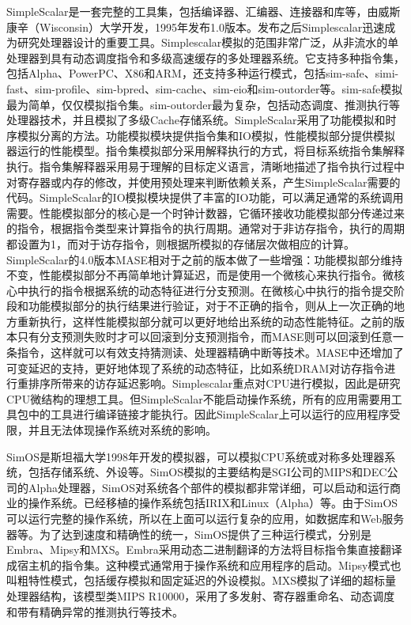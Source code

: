 \documentclass[]{ctexbook}
\begin{document}
SimpleScalar是一套完整的工具集，包括编译器、汇编器、连接器和库等，由威斯康辛（Wisconsin）大学开发，1995年发布1.0版本。发布之后Simplescalar迅速成为研究处理器设计的重要工具。Simplescalar模拟的范围非常广泛，从非流水的单处理器到具有动态调度指令和多级高速缓存的多处理器系统。它支持多种指令集，包括Alpha、PowerPC、X86和ARM，还支持多种运行模式，包括sim-safe、simi-fast、sim-profile、sim-bpred、sim-cache、sim-eio和sim-outorder等。sim-safe模拟最为简单，仅仅模拟指令集。sim-outorder最为复杂，包括动态调度、推测执行等处理器技术，并且模拟了多级Cache存储系统。SimpleScalar采用了功能模拟和时序模拟分离的方法。功能模拟模块提供指令集和IO模拟，性能模拟部分提供模拟器运行的性能模型。指令集模拟部分采用解释执行的方式，将目标系统指令集解释执行。指令集解释器采用易于理解的目标定义语言，清晰地描述了指令执行过程中对寄存器或内存的修改，并使用预处理来判断依赖关系，产生SimpleScalar需要的代码。SimpleScalar的IO模拟模块提供了丰富的IO功能，可以满足通常的系统调用需要。性能模拟部分的核心是一个时钟计数器，它循环接收功能模拟部分传递过来的指令，根据指令类型来计算指令的执行周期。通常对于非访存指令，执行的周期都设置为1，而对于访存指令，则根据所模拟的存储层次做相应的计算。SimpleScalar的4.0版本MASE相对于之前的版本做了一些增强：功能模拟部分维持不变，性能模拟部分不再简单地计算延迟，而是使用一个微核心来执行指令。微核心中执行的指令根据系统的动态特征进行分支预测。在微核心中执行的指令提交阶段和功能模拟部分的执行结果进行验证，对于不正确的指令，则从上一次正确的地方重新执行，这样性能模拟部分就可以更好地给出系统的动态性能特征。之前的版本只有分支预测失败时才可以回滚到分支预测指令，而MASE则可以回滚到任意一条指令，这样就可以有效支持猜测读、处理器精确中断等技术。MASE中还增加了可变延迟的支持，更好地体现了系统的动态特征，比如系统DRAM对访存指令进行重排序所带来的访存延迟影响。Simplescalar重点对CPU进行模拟，因此是研究CPU微结构的理想工具。但SimpleScalar不能启动操作系统，所有的应用需要用工具包中的工具进行编译链接才能执行。因此SimpleScalar上可以运行的应用程序受限，并且无法体现操作系统对系统的影响。

SimOS是斯坦福大学1998年开发的模拟器，可以模拟CPU系统或对称多处理器系统，包括存储系统、外设等。SimOS模拟的主要结构是SGI公司的MIPS和DEC公司的Alpha处理器，SimOS对系统各个部件的模拟都非常详细，可以启动和运行商业的操作系统。已经移植的操作系统包括IRIX和Linux（Alpha）等。由于SimOS可以运行完整的操作系统，所以在上面可以运行复杂的应用，如数据库和Web服务器等。为了达到速度和精确性的统一，SimOS提供了三种运行模式，分别是Embra、Mipsy和MXS。Embra采用动态二进制翻译的方法将目标指令集直接翻译成宿主机的指令集。这种模式通常用于操作系统和应用程序的启动。Mipsy模式也叫粗特性模式，包括缓存模拟和固定延迟的外设模拟。MXS模拟了详细的超标量处理器结构，该模型类MIPS R10000，采用了多发射、寄存器重命名、动态调度和带有精确异常的推测执行等技术。
\end{document}
